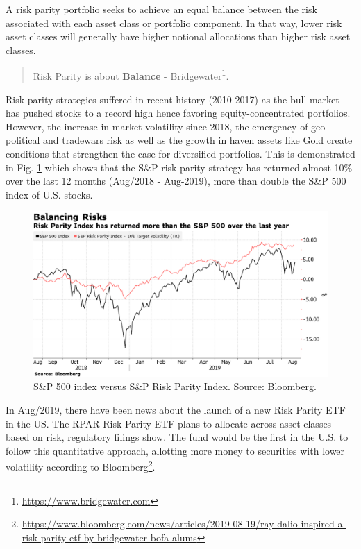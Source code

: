 \documentclass[]{book}
\DeclareRobustCommand{\href}[2]{#2\footnote{\url{#1}}}
\theoremstyle{definition}
\theoremstyle{definition}
\theoremstyle{definition}
\theoremstyle{remark}
\begin{document}
A risk parity portfolio seeks to achieve an equal balance between the
risk associated with each asset class or portfolio component. In that
way, lower risk asset classes will generally have higher notional
allocations than higher risk asset classes.

\begin{quote}
Risk Parity is about \textbf{Balance} -
\href{https://www.bridgewater.com}{Bridgewater}.
\end{quote}

Risk parity strategies suffered in recent history (2010-2017) as the
bull market has pushed stocks to a record high hence favoring
equity-concentrated portfolios. However, the increase in market
volatility since 2018, the emergency of geo-political and tradewars risk
as well as the growth in haven assets like Gold create conditions that
strengthen the case for diversified portfolios. This is demonstrated in
Fig. \ref{fig:riskparityBLO} which shows that the S\&P risk parity
strategy has returned almost 10\% over the last 12 months (Aug/2018 -
Aug-2019), more than double the S\&P 500 index of U.S. stocks.

\begin{figure}[H]

{\centering \includegraphics[width=1\linewidth]{./chapters/RiskParity/riskparity} 

}

\caption{S&P 500 index versus S&P Risk Parity Index. Source: Bloomberg.}\label{fig:riskparityBLO}
\end{figure}

In Aug/2019, there have been news about the launch of a new Risk Parity
ETF in the US. The RPAR Risk Parity ETF plans to allocate across asset
classes based on risk, regulatory filings show. The fund would be the
first in the U.S. to follow this quantitative approach, allotting more
money to securities with lower volatility according to
\href{https://www.bloomberg.com/news/articles/2019-08-19/ray-dalio-inspired-a-risk-parity-etf-by-bridgewater-bofa-alums}{Bloomberg}.
\end{document}
